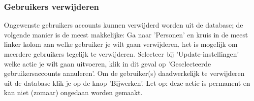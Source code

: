 \subsubsection{Gebruikers verwijderen}

Ongewenste gebruikers accounts kunnen verwijderd worden uit de database; de volgende manier is de meest makkelijke:
Ga naar 'Personen' en kruis in de meest linker kolom aan welke gebruiker je wilt gaan verwijderen, het is mogelijk om meerdere gebruikers tegelijk te verwijderen. Selecteer bij 'Update-instellingen' welke actie je wilt gaan uitvoeren, klik in dit geval op 'Geselecteerde gebruikersaccounts annuleren'. Om de gebruiker(s) daadwerkelijk te verwijderen uit de database klik je op de knop 'Bijwerken'. Let op: deze actie is permanent en kan niet (zomaar) ongedaan worden gemaakt. 

